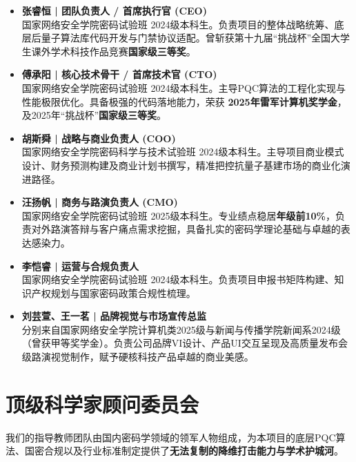\begin{itemize}
	\item \textbf{张睿恒 | 团队负责人 / 首席执行官 (CEO)} \\
	国家网络安全学院密码试验班 2024级本科生。负责项目的整体战略统筹、底层后量子算法库代码开发与门禁协议适配。曾斩获第十九届“挑战杯”全国大学生课外学术科技作品竞赛\textbf{国家级三等奖}。
	
	\item \textbf{傅承阳 | 核心技术骨干 / 首席技术官 (CTO)} \\
	国家网络安全学院密码试验班 2024级本科生。主导PQC算法的工程化实现与性能极限优化。具备极强的代码落地能力，荣获 \textbf{2025年雷军计算机奖学金}，及2025年“挑战杯”\textbf{国家级三等奖}。
	
	\item \textbf{胡斯舜 | 战略与商业负责人 (COO)} \\
	国家网络安全学院密码科学与技术试验班 2024级本科生。主导项目商业模式设计、财务预测构建及商业计划书撰写，精准把控抗量子基建市场的商业化演进路径。
	
	\item \textbf{汪扬帆 | 商务与路演负责人 (CMO)} \\
	国家网络安全学院密码试验班 2025级本科生。专业绩点稳居\textbf{年级前10\%}，负责对外路演答辩与客户痛点需求挖掘，具备扎实的密码学理论基础与卓越的表达感染力。
	
	\item \textbf{李恺睿 | 运营与合规负责人} \\
	国家网络安全学院密码试验班 2024级本科生。负责项目申报书矩阵构建、知识产权规划与国家密码政策合规性梳理。
	
	\item \textbf{刘芸萱、王一茗 | 品牌视觉与市场宣传总监} \\
	分别来自国家网络安全学院计算机类2025级与新闻与传播学院新闻系2024级（曾获甲等奖学金）。负责公司品牌VI设计、产品UI交互呈现及高质量发布会级路演视觉制作，赋予硬核科技产品卓越的商业美感。
\end{itemize}

\section{顶级科学家顾问委员会}

我们的指导教师团队由国内密码学领域的领军人物组成，为本项目的底层PQC算法、国密合规以及行业标准制定提供了\textbf{无法复制的降维打击能力与学术护城河}。

